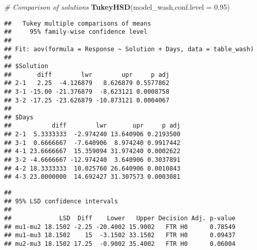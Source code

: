 \documentclass[]{article}
\newenvironment{Shaded}{\begin{snugshade}}{\end{snugshade}}
\newcommand{\CommentTok}[1]{\textcolor[rgb]{0.56,0.35,0.01}{\textit{#1}}}
\newcommand{\DataTypeTok}[1]{\textcolor[rgb]{0.13,0.29,0.53}{#1}}
\newcommand{\FloatTok}[1]{\textcolor[rgb]{0.00,0.00,0.81}{#1}}
\newcommand{\KeywordTok}[1]{\textcolor[rgb]{0.13,0.29,0.53}{\textbf{#1}}}
\newcommand{\NormalTok}[1]{#1}
\newcommand{\OperatorTok}[1]{\textcolor[rgb]{0.81,0.36,0.00}{\textbf{#1}}}
\newcommand{\OtherTok}[1]{\textcolor[rgb]{0.56,0.35,0.01}{#1}}
\newcommand{\StringTok}[1]{\textcolor[rgb]{0.31,0.60,0.02}{#1}}
\begin{document}
\begin{Shaded}
\begin{Highlighting}[]
\CommentTok{# Comparison of solutions}
\KeywordTok{TukeyHSD}\NormalTok{(model_wash,}\DataTypeTok{conf.level =} \FloatTok{0.95}\NormalTok{)}
\end{Highlighting}
\end{Shaded}

\begin{verbatim}
##   Tukey multiple comparisons of means
##     95% family-wise confidence level
## 
## Fit: aov(formula = Response ~ Solution + Days, data = table_wash)
## 
## $Solution
##       diff        lwr        upr     p adj
## 2-1   2.25  -4.126879   8.626879 0.5577862
## 3-1 -15.00 -21.376879  -8.623121 0.0008758
## 3-2 -17.25 -23.626879 -10.873121 0.0004067
## 
## $Days
##           diff        lwr       upr     p adj
## 2-1  5.3333333  -2.974240 13.640906 0.2193500
## 3-1  0.6666667  -7.640906  8.974240 0.9917442
## 4-1 23.6666667  15.359094 31.974240 0.0002622
## 3-2 -4.6666667 -12.974240  3.640906 0.3037891
## 4-2 18.3333333  10.025760 26.640906 0.0010843
## 4-3 23.0000000  14.692427 31.307573 0.0003081
\end{verbatim}

\begin{Shaded}
\end{Shaded}

\begin{verbatim}
## 
## 95% LSD confidence intervals 
## 
##             LSD  Diff    Lower   Upper Decision Adj. p-value
## mu1-mu2 18.1502 -2.25 -20.4002 15.9002   FTR H0      0.78549
## mu1-mu3 18.1502    15  -3.1502 33.1502   FTR H0      0.09437
## mu2-mu3 18.1502 17.25  -0.9002 35.4002   FTR H0      0.06004
\end{verbatim}

\begin{Shaded}
\end{Shaded}
\end{document}
